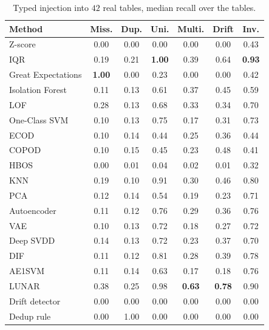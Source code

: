 \documentclass[conference]{IEEEtran}
\begin{document}
\begin{table}[t]
\caption{Typed injection into $42$ real tables, median recall over the tables.}
\label{tab:m-typed}
\centering
\footnotesize
\setlength{\tabcolsep}{3pt}
\begin{tabular}{lcccccc}
\toprule
Method & Miss. & Dup. & Uni. & Multi. & Drift & Inv. \\
\midrule
Z-score            & 0.00 & 0.00 & 0.00 & 0.00 & 0.00 & 0.43 \\
IQR                & 0.19 & 0.21 & \textbf{1.00} & 0.39 & 0.64 & \textbf{0.93} \\
Great Expectations & \textbf{1.00} & 0.00 & 0.23 & 0.00 & 0.00 & 0.42 \\
\midrule
Isolation Forest   & 0.11 & 0.13 & 0.61 & 0.37 & 0.45 & 0.59 \\
LOF                & 0.28 & 0.13 & 0.68 & 0.33 & 0.34 & 0.70 \\
One-Class SVM      & 0.10 & 0.13 & 0.75 & 0.17 & 0.31 & 0.73 \\
ECOD               & 0.10 & 0.14 & 0.44 & 0.25 & 0.36 & 0.44 \\
COPOD              & 0.10 & 0.15 & 0.45 & 0.23 & 0.48 & 0.41 \\
HBOS               & 0.00 & 0.01 & 0.04 & 0.02 & 0.01 & 0.32 \\
KNN                & 0.19 & 0.10 & 0.91 & 0.30 & 0.46 & 0.80 \\
PCA                & 0.12 & 0.14 & 0.54 & 0.19 & 0.23 & 0.71 \\
\midrule
Autoencoder        & 0.11 & 0.12 & 0.76 & 0.29 & 0.36 & 0.76 \\
VAE                & 0.10 & 0.13 & 0.72 & 0.18 & 0.27 & 0.72 \\
Deep SVDD          & 0.14 & 0.13 & 0.72 & 0.23 & 0.37 & 0.70 \\
DIF                & 0.11 & 0.12 & 0.81 & 0.28 & 0.39 & 0.78 \\
AE1SVM             & 0.11 & 0.14 & 0.63 & 0.17 & 0.18 & 0.76 \\
LUNAR              & 0.38 & 0.25 & 0.98 & \textbf{0.63} & \textbf{0.78} & 0.90 \\
\midrule
Drift detector     & 0.00 & 0.00 & 0.00 & 0.00 & 0.00 & 0.00 \\
Dedup rule         & 0.00 & 1.00 & 0.00 & 0.00 & 0.00 & 0.00 \\
\bottomrule
\end{tabular}
\end{table}
\end{document}
